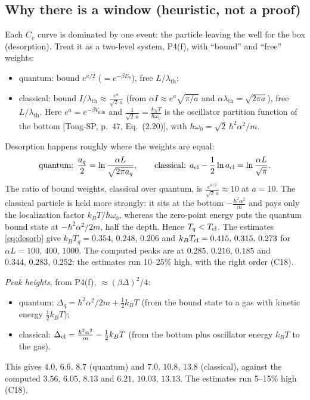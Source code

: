 \documentclass[11pt]{article}
\numberwithin{equation}{section}
\newcommand{\lth}{\lambda_{\mathrm{th}}}
\newcommand{\kB}{k_B}
\newcommand{\Eu}{\hbar^2\alpha^2/2m}
\newcommand{\chk}[1]{{\footnotesize\textsf{(#1)}}}
\begin{document}
\subsection{Why there is a window (heuristic, not a proof)}
\label{sec:heuristic}
Each $C_v$ curve is dominated by one event: the particle leaving the well for the box (desorption). Treat it as a two-level system, P4(f), with ``bound'' and ``free'' weights:
\begin{itemize}
\item quantum: bound $e^{a/2}$ ($=e^{-\beta E_b}$), free $L/\lth$;
\item classical: bound $I/\lth\approx\frac{e^a}{\sqrt2\,a}$ (from $\alpha I\approx e^a\sqrt{\pi/a}$ and $\alpha\lth=\sqrt{2\pi a}$), free $L/\lth$. Here $e^a=e^{-\beta V_{\min}}$ and $\frac{1}{\sqrt2\,a}=\frac{\kB T}{\hbar\omega_0}$ is the oscillator partition function of the bottom [Tong-SP, p.~47, Eq.~(2.20)], with $\hbar\omega_0=\sqrt2\,\hbar^2\alpha^2/m$.
\end{itemize}
Desorption happens roughly where the weights are equal:
\begin{equation}
\text{quantum: }\frac{a_q}{2}=\ln\frac{\alpha L}{\sqrt{2\pi a_q}},\qquad \text{classical: }a_{\rm cl}-\frac12\ln a_{\rm cl}=\ln\frac{\alpha L}{\sqrt\pi}.
\label{eq:desorb}
\end{equation}
The ratio of bound weights, classical over quantum, is $\frac{e^{a/2}}{\sqrt2\,a}\approx10$ at $a=10$. The classical particle is held more strongly: it sits at the bottom $-\frac{\hbar^2\alpha^2}{m}$ and pays only the localization factor $\kB T/\hbar\omega_0$, whereas the zero-point energy puts the quantum bound state at $-\Eu$, half the depth. Hence $T_q<T_{\rm cl}$. The estimates \eqref{eq:desorb} give $\kB T_q=0.354,\,0.248,\,0.206$ and $\kB T_{\rm cl}=0.415,\,0.315,\,0.273$ for $\alpha L=100,\,400,\,1000$. The computed peaks are at $0.285,\,0.216,\,0.185$ and $0.344,\,0.283,\,0.252$: the estimates run 10--25\% high, with the right order \chk{C18}.

\emph{Peak heights}, from P4(f), $\approx(\beta\Delta)^2/4$:
\begin{itemize}
\item quantum: $\Delta_q=\Eu+\frac12\kB T$ (from the bound state to a gas with kinetic energy $\frac12\kB T$);
\item classical: $\Delta_{\rm cl}=\frac{\hbar^2\alpha^2}{m}-\frac12\kB T$ (from the bottom plus oscillator energy $\kB T$ to the gas).
\end{itemize}
This gives $4.0,\,6.6,\,8.7$ (quantum) and $7.0,\,10.8,\,13.8$ (classical), against the computed $3.56,\,6.05,\,8.13$ and $6.21,\,10.03,\,13.13$. The estimates run 5--15\% high \chk{C18}.
\end{document}
